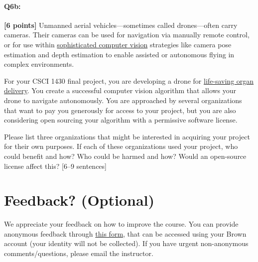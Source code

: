 \documentclass{csci1430}
\begin{document}
\pagebreak
\paragraph{Q6b:} \textbf{[6 points]} Unmanned aerial vehicles---sometimes called drones---often carry cameras. Their cameras can be used for navigation via manually remote control, or for use within \href{https://link.springer.com/article/10.1007/s10846-017-0483-z}{sophisticated computer vision} strategies like camera pose estimation and depth estimation to enable assisted or autonomous flying in complex environments.

For your CSCI 1430 final project, you are developing a drone for \href{https://www.cnn.com/2019/05/01/health/drone-organ-transplant-bn-trnd/index.html}{life-saving organ delivery}. You create a successful computer vision algorithm that allows your drone to navigate autonomously. You are approached by several organizations that want to pay you generously for access to your project, but you are also considering open sourcing your algorithm with a permissive software license.

\begin{tcolorbox}[colback=orange!5!white,colframe=orange!75!black]
Please list three organizations that might be interested in acquiring your project for their own purposes. If each of these organizations used your project, who could benefit and how? Who could be harmed and how? Would an open-source license affect this? [6–9 sentences]
\end{tcolorbox}


\pagebreak
\section*{Feedback? (Optional)}
We appreciate your feedback on how to improve the course. You can provide anonymous feedback through \href{https://forms.gle/Eu5jJbDUmLknAyJV9}{this form}, that can be accessed using your Brown account (your identity will not be collected). If you have urgent non-anonymous comments/questions, please email the instructor.
\end{document}
